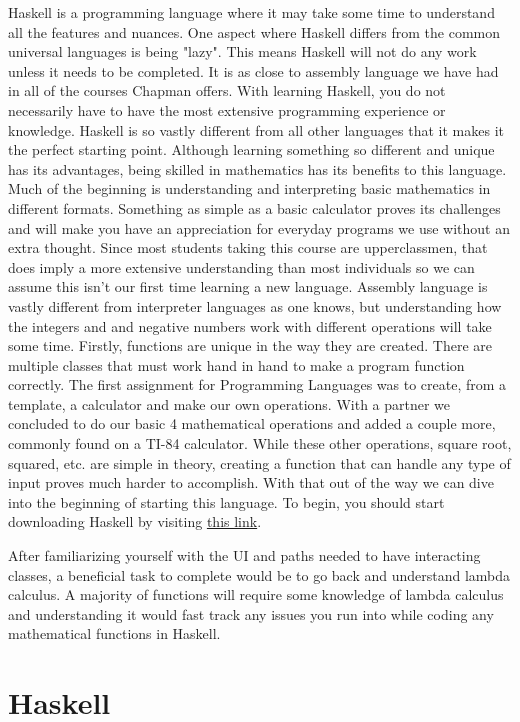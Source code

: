 \documentclass{article}
\begin{document}
Haskell is a programming language where it may take some time to understand all the features and nuances. One aspect where Haskell differs from the common universal languages is being "lazy". This means Haskell will not do any work unless it needs to be completed. It is as close to assembly language we have had in all of the courses Chapman offers. With learning Haskell, you do not necessarily have to have the most extensive programming experience or knowledge. Haskell is so vastly different from all other languages that it makes it the perfect starting point. Although learning something so different and unique has its advantages, being skilled in mathematics has its benefits to this language. Much of the beginning is understanding and interpreting basic mathematics in different formats. Something as simple as a basic calculator proves its challenges and will make you have an appreciation for everyday programs we use without an extra thought. Since most students taking this course are upperclassmen, that does imply a more extensive understanding than most individuals so we can assume this isn’t our first time learning a new language. Assembly language is vastly different from interpreter languages as one knows, but understanding how the integers and and negative numbers work with different operations will take some time. Firstly, functions are unique in the way they are created. There are multiple classes that must work hand in hand to make a program function correctly. The first assignment for Programming Languages was to create, from a template, a calculator and make our own operations. With a partner we concluded to do our basic 4 mathematical operations and added a couple more, commonly found on a TI-84 calculator. While these other operations, square root, squared, etc. are simple in theory, creating a function that can handle any type of input proves much harder to accomplish. With that out of the way we can dive into the beginning of starting this language. To begin, you should start downloading Haskell by visiting \href{https://hackmd.io/@alexhkurz/Hk86XnCzD}{this link}.

\medskip\noindent
After familiarizing yourself with the UI and paths needed to have interacting classes, a beneficial task to complete would be to go back and understand lambda calculus. A majority of functions will require some knowledge of lambda calculus and understanding it would fast track any issues you run into while coding any mathematical functions in Haskell. 
    
\section{Haskell}\label{haskell}
\end{document}
